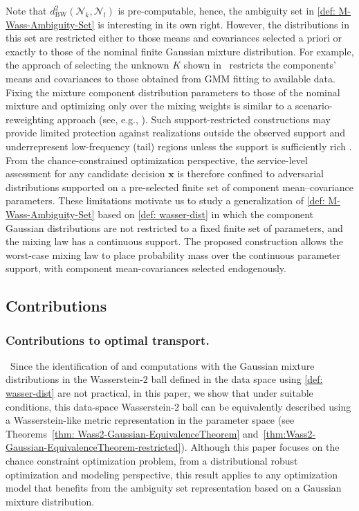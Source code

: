 \documentclass[opre,sglanonrev]{informs4}
\newcommand{\mN}{\mathcal{N}}
\newcommand{\bx}{\bm{x}}
\begin{document}
Note that $d^2_{\mathrm{BW}}({\mN}_k, \mN_l)$ is pre-computable, hence, the ambiguity set in \eqref{def: M-Wass-Ambiguity-Set} is interesting in its own right. However, the distributions in this set are restricted either to those means and covariances selected a priori or exactly to those of the nominal finite Gaussian mixture distribution. For example, the approach of selecting the unknown $K$ shown in~\cite[Proposition 3]{yoon2025data} restricts the components' means and covariances to those obtained from GMM fitting to available data. Fixing the mixture component distribution parameters to those of the nominal mixture and optimizing only over the mixing weights is similar to a scenario-reweighting approach (see, e.g., \cite{kammammettu2024distributionally}). Such support-restricted constructions may provide limited protection against realizations outside the observed support and underrepresent low-frequency (tail) regions unless the support is sufficiently rich \cite{ben-tal_den-hertog_dewaegenaere_2013,duchi_namkoong_2019,gao_kleywegt_2023,luo2019decomposition}. From the chance-constrained optimization perspective, the service-level assessment for any candidate decision $\bx$ is therefore confined to adversarial distributions supported on a pre-selected finite set of component mean--covariance parameters.
These limitations motivate us to study a generalization of \eqref{def: M-Wass-Ambiguity-Set} based on \eqref{def: wasser-dist} in which the component Gaussian distributions are not restricted to a fixed finite set of parameters, and the mixing law has a continuous support. 
The proposed construction allows the worst-case mixing law to place probability mass over the continuous parameter support, with component mean-covariances selected endogenously.
\subsection{Contributions}

\subsubsection{Contributions to optimal transport. }\, Since the identification of and computations with the Gaussian mixture distributions in the  Wasserstein-$2$ ball defined in the data space using \eqref{def: wasser-dist} are not practical, in this paper, we show that under suitable conditions, this data-space Wasserstein-$2$ ball can be equivalently described using a Wasserstein-like metric representation in the parameter space (see Theorems~\ref{thm: Wass2-Gaussian-EquivalenceTheorem} and~\ref{thm:Wass2-Gaussian-EquivalenceTheorem-restricted}). Although this paper focuses on the chance constraint optimization problem, from a distributional robust optimization and modeling perspective, this result applies to any optimization model that benefits from the ambiguity set representation based on a Gaussian mixture distribution.
\end{document}
